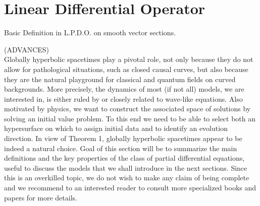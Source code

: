 \documentclass[a4paper,12pt]{scrartcl}    %
\begin{document}
\section{Linear Differential Operator}
Basic Definition in L.P.D.O. on smooth vector sections.
\\
		\begin{Warning}
		(ADVANCES)\\
		Globally hyperbolic spacetimes play a pivotal role, not only because they do not allow for pathological situations, such as closed causal curves, but also because they are the natural playground for classical and quantum fields on curved backgrounds. 
		More precisely, the dynamics of most (if not all) models, we are interested in, is either ruled by or closely related to wave-like equations. Also motivated by physics, we want to construct the associated space of solutions by solving an initial value problem. 
		To this end we need to be able to select both an hypersurface on which to assign initial data and to identify an evolution direction. In view of Theorem 1, globally hyperbolic spacetimes appear to be indeed a natural choice. 
		Goal of this section will be to summarize the main definitions and the key properties of the class of partial differential equations, useful to discuss the models that we shall introduce in the next sections. 
		Since this is an overkilled topic, we do not wish to make any claim of being complete and we recommend to an interested reader to consult more specialized books and papers for more details.
		\end{Warning}
\end{document}

